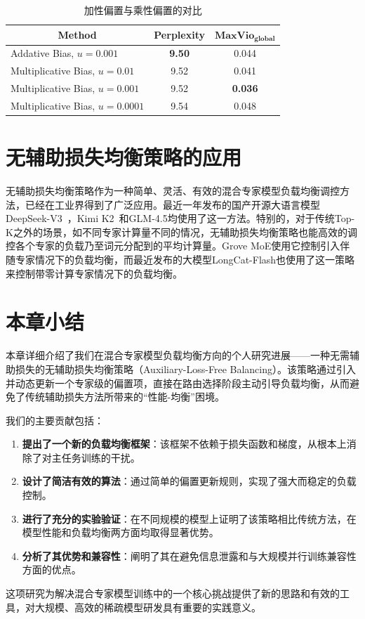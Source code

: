 \begin{table}[t]
\caption{加性偏置与乘性偏置的对比}
\label{tab:multiplicative_bias_comparison}
\begin{center}
\begin{tabular}{l|c|c}
\toprule
\multicolumn{1}{c|}{\textbf{Method}} & \textbf{Perplexity} & $\textbf{MaxVio}_\textbf{global}$ \\
\midrule
Addative Bias, $u=0.001$ & \textbf{9.50} & 0.044 \\
Multiplicative Bias, $u=0.01$ & 9.52 & 0.041 \\ 
Multiplicative Bias, $u=0.001$ &  9.52 & \textbf{0.036} \\
Multiplicative Bias, $u=0.0001$ & 9.54  & 0.048 \\
\bottomrule
\end{tabular}
\end{center}
\end{table}

\section{无辅助损失均衡策略的应用}
无辅助损失均衡策略作为一种简单、灵活、有效的混合专家模型负载均衡调控方法，已经在工业界得到了广泛应用。最近一年发布的国产开源大语言模型DeepSeek-V3~\cite{DeepSeekAI2024DeepSeekV3TR}，Kimi K2~\cite{Bai2025KimiKO}和GLM-4.5\cite{Zeng2025GLM45AR}均使用了这一方法。特别的，对于传统Top-K之外的场景，如不同专家计算量不同的情况，无辅助损失均衡策略也能高效的调控各个专家的负载乃至词元分配到的平均计算量。Grove MoE\cite{Wu2025GroveMT}使用它控制引入伴随专家情况下的负载均衡，而最近发布的大模型LongCat-Flash\cite{meituan-longcat_2025_longcat-flash-chat}也使用了这一策略来控制带零计算专家情况下的负载均衡。

\section{本章小结}
\label{sec:chapter_summary_personal}
本章详细介绍了我们在混合专家模型负载均衡方向的个人研究进展——一种无需辅助损失的无辅助损失均衡策略（Auxiliary-Loss-Free Balancing）。该策略通过引入并动态更新一个专家级的偏置项，直接在路由选择阶段主动引导负载均衡，从而避免了传统辅助损失方法所带来的“性能-均衡”困境。

我们的主要贡献包括：
\begin{enumerate}
    \item \textbf{提出了一个新的负载均衡框架}：该框架不依赖于损失函数和梯度，从根本上消除了对主任务训练的干扰。
    \item \textbf{设计了简洁有效的算法}：通过简单的偏置更新规则，实现了强大而稳定的负载控制。
    \item \textbf{进行了充分的实验验证}：在不同规模的模型上证明了该策略相比传统方法，在模型性能和负载均衡两方面均取得显著优势。
    \item \textbf{分析了其优势和兼容性}：阐明了其在避免信息泄露和与大规模并行训练兼容性方面的优点。
\end{enumerate}

这项研究为解决混合专家模型训练中的一个核心挑战提供了新的思路和有效的工具，对大规模、高效的稀疏模型研发具有重要的实践意义。
